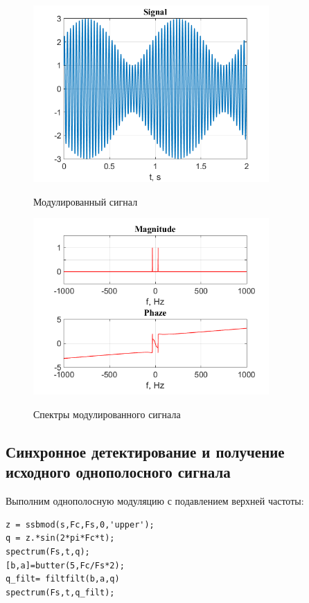 \documentclass[a4paper,14pt]{article}
\begin{document}
\begin{figure}[h]
\begin{multicols}{1}
\hfill
\includegraphics[width=90mm]{am4}
\hfill
\caption{Модулированный сигнал}
\label{figBottom}
\hfill
\includegraphics[width=90mm]{am4_spec}
\hfill
\caption{Спектры модулированного сигнала}
\label{figDown}
\end{multicols}
\end{figure}

\newpage
\subsection{Синхронное детектирование и получение исходного однополосного сигнала}

Выполним однополосную модуляцию с подавлением верхней частоты:

\begin{lstlisting}
z = ssbmod(s,Fc,Fs,0,'upper');
q = z.*sin(2*pi*Fc*t);
spectrum(Fs,t,q);
[b,a]=butter(5,Fc/Fs*2);
q_filt= filtfilt(b,a,q)
spectrum(Fs,t,q_filt);
\end{lstlisting}
\end{document}
